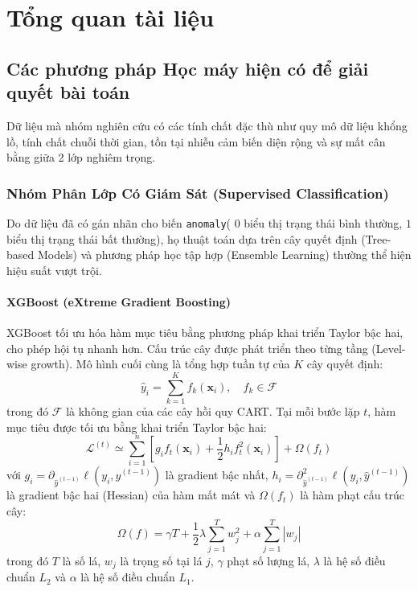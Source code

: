 \section{Tổng quan tài liệu}
\subsection{Các phương pháp Học máy hiện có để giải quyết bài toán}
Dữ liệu mà nhóm nghiên cứu có các tính chất đặc thù như quy mô dữ liệu khổng lồ, tính chất chuỗi thời gian, tồn tại nhiễu cảm biến diện rộng và sự mất cân bằng giữa 2 lớp nghiêm trọng.

\subsubsection{Nhóm Phân Lớp Có Giám Sát (Supervised Classification)}
Do dữ liệu đã có gán nhãn cho biến \texttt{anomaly}( $0$ biểu thị trạng thái bình thường, $1$ biểu thị trạng thái bất thường), họ thuật toán dựa trên cây quyết định (Tree-based Models) và phương pháp học tập hợp (Ensemble Learning) thường thể hiện hiệu suất vượt trội.

\paragraph{XGBoost (eXtreme Gradient Boosting)}\hspace{1cm}

XGBoost tối ưu hóa hàm mục tiêu bằng phương pháp khai triển Taylor bậc hai, cho phép hội tụ nhanh hơn. Cấu trúc cây được phát triển theo từng tầng (Level-wise growth). Mô hình cuối cùng là tổng hợp tuần tự của $K$ cây quyết định:
\begin{equation*}
    \hat{y}_i = \sum_{k=1}^{K} f_k(\mathbf{x}_i), \quad f_k \in \mathcal{F}
\end{equation*}
trong đó $\mathcal{F}$ là không gian của các cây hồi quy CART. Tại mỗi bước lặp $t$, hàm mục tiêu được tối ưu bằng khai triển Taylor bậc hai:
\begin{equation*}
    \mathcal{L}^{(t)} \simeq \sum_{i=1}^{n} \left[ g_i f_t(\mathbf{x}_i) + \frac{1}{2} h_i f_t^2(\mathbf{x}_i) \right] + \Omega(f_t)
\end{equation*}
với $g_i = \partial_{\hat{y}^{(t-1)}} \ell(y_i, \hat{y}^{(t-1)})$ là gradient bậc nhất, $h_i = \partial^2_{\hat{y}^{(t-1)}} \ell(y_i, \hat{y}^{(t-1)})$ là gradient bậc hai (Hessian) của hàm mất mát và $\Omega(f_t)$ là hàm phạt cấu trúc cây:
\begin{equation*}
    \Omega(f) = \gamma T + \frac{1}{2} \lambda \sum_{j=1}^{T} w_j^2 + \alpha \sum_{j=1}^{T} |w_j|
\end{equation*}
trong đó $T$ là số lá, $w_j$ là trọng số tại lá $j$, $\gamma$ phạt số lượng lá, $\lambda$ là hệ số điều chuẩn $L_2$ và $\alpha$ là hệ số điều chuẩn $L_1$.\\

